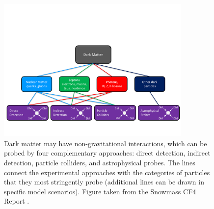 \begin{figure}[t]
\centering
\includegraphics[width=0.85\textwidth]{figures/interactions.pdf}
\caption{
\label{fig:interactions}
Dark matter may have non-gravitational interactions, which can be probed by four complementary approaches: 
direct detection, indirect detection, particle colliders, and astrophysical probes.
The lines connect the experimental approaches with the categories of particles that they most stringently probe (additional lines can be drawn in specific model scenarios). 
Figure taken from the Snowmass CF4 Report \citep{1305.1605}.
}
\end{figure}

